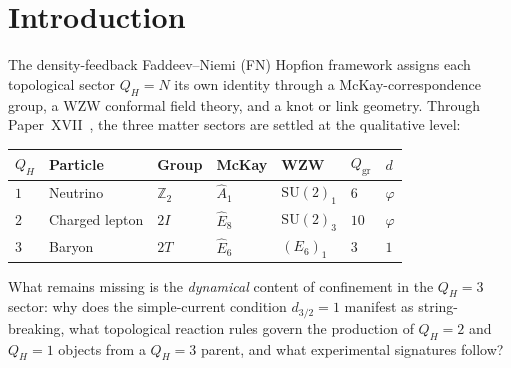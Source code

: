 \documentclass[11pt,a4paper]{article}
\theoremstyle{definition}\newtheorem{definition}[theorem]{Definition}
\theoremstyle{remark}
\newcommand{\vp}{\varphi}
\newcommand{\SU}{\mathrm{SU}}
\newcommand{\twoI}{2I}
\newcommand{\twoT}{2T}
\newcommand{\QH}{Q_H}
\newcommand{\Ztwo}{\mathbb{Z}_2}
\newcommand{\Zthree}{\mathbb{Z}_3}
\newcommand{\dimq}[1]{d_{#1}}
\newcommand{\phistar}{\phi^*}
\begin{document}
\begin{abstract}
crossing vertices of $T_{2,3}$ are 120° apart in azimuth and their
tangent vectors lie exactly in the $z=0$ plane.  When a baryon
($\QH=3$) fragments to produce $\rho^+\rho^-$ ($\QH=2$ pairs), the
relative decay-plane angle $\phistar$ is set by this crossing geometry,
predicting a distribution $W(\phistar)\propto 1+a_3\cos(3\phistar)$
peaked at $\phistar=2\pi/3$, with $a_1=a_2=0$ enforced by $\Zthree$
symmetry.  Photon-initiated $\rho^+\rho^-$ production (no $\QH=3$
parent) carries no such geometric constraint, giving the standard
helicity-governed $a_2\cos(2\phistar)$ form.  The process-dependence
is a parameter-free, falsifiable prediction.
Two speculative correspondences --- a six-quark counting from
$\binom{3}{1}+\binom{3}{2}=6$ midpoint-breaking combinations, and an
isospin assignment from the $\Ztwo$ writhe asymmetry of $T_{2,3}$ ---
are recorded as conjectures.
\end{abstract}

\tableofcontents
\bigskip\newpage

\section{Introduction}
\label{P18:sec:intro}

The density-feedback Faddeev--Niemi (FN) Hopfion framework
assigns each topological sector $\QH=N$ its own identity through a
McKay-correspondence group, a WZW conformal field theory, and a
knot or link geometry.  Through Paper~XVII~\cite{Paper17}, the three
matter sectors are settled at the qualitative level:
\begin{center}
\renewcommand{\arraystretch}{1.35}
\begin{tabular}{lllllll}
\toprule
$\QH$ & Particle & Group & McKay & WZW & $Q_{\mathrm{gr}}$ & $\dimq{}$ \\
\midrule
$1$ & Neutrino & $\Ztwo$ & $\widehat{A}_1$ & $\SU(2)_1$ & $6$ & $\vp$ \\
$2$ & Charged lepton & $\twoI$ & $\widehat{E}_8$ & $\SU(2)_3$ & $10$ & $\vp$ \\
$3$ & Baryon & $\twoT$ & $\widehat{E}_6$ & $(E_6)_1$ & $3$ & $1$ \\
\bottomrule
\end{tabular}
\end{center}
What remains missing is the \emph{dynamical} content of confinement
in the $\QH=3$ sector: why does the simple-current condition
$\dimq{3/2}=1$ manifest as string-breaking, what topological reaction
rules govern the production of $\QH=2$ and $\QH=1$ objects from a
$\QH=3$ parent, and what experimental signatures follow?
\end{document}
